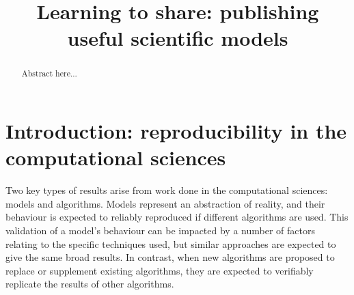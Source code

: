 \documentclass[conference]{IEEEtran}
\begin{document}

\title{Learning to share: publishing useful scientific models}

\author{
\and
{}
}

\maketitle

\begin{abstract}
Abstract here...
\end{abstract}

\IEEEpeerreviewmaketitle

\section{Introduction: reproducibility in the computational sciences}
Two key types of results arise from work done in the computational
sciences: models and algorithms. Models represent an abstraction of
reality, and their behaviour is expected to reliably reproduced if
different algorithms are used. This validation of a model's behaviour
can be impacted by a number of factors relating to the specific
techniques used, but similar approaches are expected to give the same
broad results.  In contrast, when new algorithms are proposed to
replace or supplement existing algorithms, they are expected to
verifiably replicate the results of other algorithms.
\end{document}
